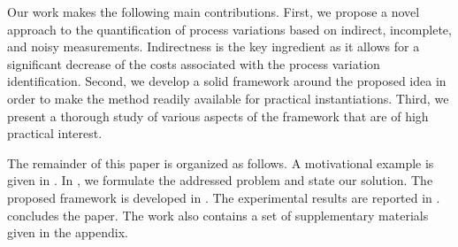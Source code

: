 Our work makes the following main contributions. First, we propose a novel approach to the quantification of process variations based on indirect, incomplete, and noisy measurements. Indirectness is the key ingredient as it allows for a significant decrease of the costs associated with the process variation identification. Second, we develop a solid framework around the proposed idea in order to make the method readily available for practical instantiations. Third, we present a thorough study of various aspects of the framework that are of high practical interest.

The remainder of this paper is organized as follows. A motivational example is given in . In , we formulate the addressed problem and state our solution. The proposed framework is developed in . The experimental results are reported in .  concludes the paper. The work also contains a set of supplementary materials given in the appendix.
